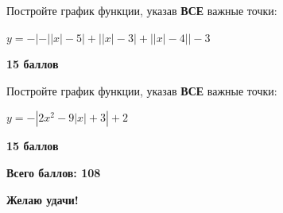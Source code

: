  Постройте график функции, указав \textbf{ВСЕ} важные точки:

$y=-\left|-\left|\left|x\right|-5\right|+\left|\left|x\right|-3\right|+\left|\left|x\right|-4\right|\right|-3$

\begin{flushright} \textbf{15 баллов}\\ 
\end{flushright}

 Постройте график функции, указав \textbf{ВСЕ} важные точки:

$y=-\left|2x^{2}-9\left|x\right|+3\right|+2$

\begin{flushright} \textbf{15 баллов}\\ 
\end{flushright}

\centerline{\bf }


\centerline{\bf  Всего баллов: 108}
\centerline{\bf  Желаю удачи!}